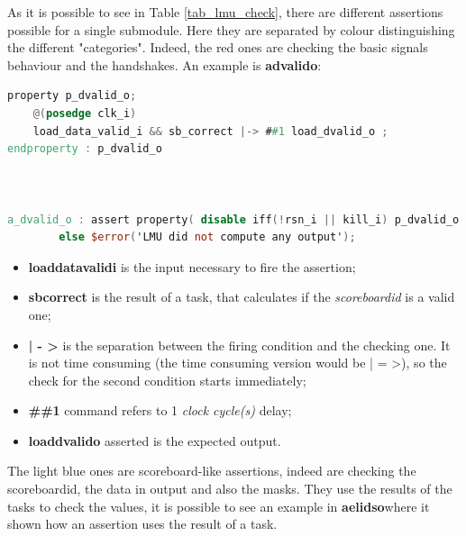 As it is possible to see in Table \ref{tab_lmu_check}, there are different assertions possible for a single submodule. 
Here they are separated by colour distinguishing the different "categories".
Indeed, the red ones are checking the basic signals behaviour and the handshakes.
An example is \textbf{a\+dvalid\+o}:
\bigskip

\linespread{1}

\begin{lstlisting}[language=Verilog,style=verilog-style, backgroundcolor=\color{lyel_palette}, frame=tlb]
property p_dvalid_o;
	@(posedge clk_i)
	load_data_valid_i && sb_correct |-> ##1 load_dvalid_o ;
endproperty : p_dvalid_o



a_dvalid_o : assert property( disable iff(!rsn_i || kill_i) p_dvalid_o ) 
        else $error('LMU did not compute any output');

\end{lstlisting}
\linespread{1.2}
\bigskip
\begin{itemize}
    \item \textbf{load\+data\+valid\+i} is the input necessary to fire the assertion;
    
    \item \textbf{sb\+correct} is the result of a task, that calculates if the \emph{scoreboard\+id} is a valid one;
    
    \item \textbf{| - >} is the separation between the firing condition and the checking one. It is not time consuming (the time consuming version would be | = >), so the check for the second condition starts immediately;
    
    \item \textbf{\#\#1} command refers to 1 \textit{clock cycle(s)} delay;
    
    \item \textbf{load\+dvalid\+o} asserted is the expected output.
\end{itemize}

The light blue ones are scoreboard-like assertions, indeed are checking the scoreboard\+id, the data in output and also the masks.
They use the results of the tasks to check the values, it is possible to see an example in \textbf{a\+el\+ids\+o}where it shown how an assertion uses the result of a task.

